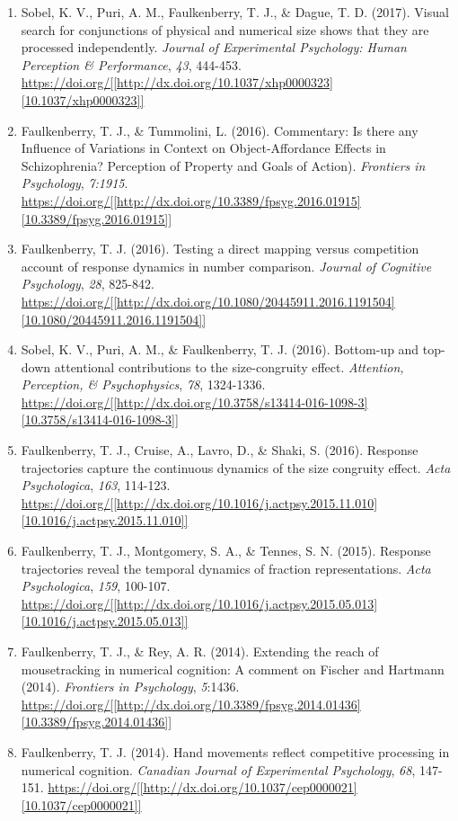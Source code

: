 \documentclass[article,10pt]{article}
\begin{document}
\begin{enumerate}
\item Sobel, K. V., Puri, A. M., Faulkenberry, T. J., \& Dague, T. D. (2017). Visual search for conjunctions of physical and numerical size shows that they are processed independently. \emph{Journal of Experimental Psychology: Human Perception \& Performance}, \emph{43}, 444-453. \url{https://doi.org/[[http://dx.doi.org/10.1037/xhp0000323][10.1037/xhp0000323]]}
\item Faulkenberry, T. J., \& Tummolini, L. (2016). Commentary: Is there any Influence of Variations in Context on Object-Affordance Effects in Schizophrenia? Perception of Property and Goals of Action). \emph{Frontiers in Psychology}, \emph{7:1915}. \url{https://doi.org/[[http://dx.doi.org/10.3389/fpsyg.2016.01915][10.3389/fpsyg.2016.01915]]}
\item Faulkenberry, T. J. (2016). Testing a direct mapping versus competition account of response dynamics in number comparison. \emph{Journal of Cognitive Psychology}, \emph{28}, 825-842. \url{https://doi.org/[[http://dx.doi.org/10.1080/20445911.2016.1191504][10.1080/20445911.2016.1191504]]}
\item Sobel, K. V., Puri, A. M., \& Faulkenberry, T. J. (2016). Bottom-up and top-down attentional contributions to the size-congruity effect. \emph{Attention, Perception, \& Psychophysics}, \emph{78}, 1324-1336. \url{https://doi.org/[[http://dx.doi.org/10.3758/s13414-016-1098-3][10.3758/s13414-016-1098-3]]}
\item Faulkenberry, T. J., Cruise, A., Lavro, D., \& Shaki, S. (2016). Response trajectories capture the continuous dynamics of the size congruity effect. \emph{Acta Psychologica}, \emph{163}, 114-123. \url{https://doi.org/[[http://dx.doi.org/10.1016/j.actpsy.2015.11.010][10.1016/j.actpsy.2015.11.010]]}
\item Faulkenberry, T. J., Montgomery, S. A., \& Tennes, S. N. (2015). Response trajectories reveal the temporal dynamics of fraction representations. \emph{Acta Psychologica}, \emph{159}, 100-107. \url{https://doi.org/[[http://dx.doi.org/10.1016/j.actpsy.2015.05.013][10.1016/j.actpsy.2015.05.013]]}
\item Faulkenberry, T. J., \& Rey, A. R. (2014). Extending the reach of mousetracking in numerical cognition: A comment on Fischer and Hartmann (2014). \emph{Frontiers in Psychology}, \emph{5}:1436. \url{https://doi.org/[[http://dx.doi.org/10.3389/fpsyg.2014.01436][10.3389/fpsyg.2014.01436]]}
\item Faulkenberry, T. J. (2014). Hand movements reflect competitive processing in numerical cognition. \emph{Canadian Journal of Experimental Psychology}, \emph{68}, 147-151. \url{https://doi.org/[[http://dx.doi.org/10.1037/cep0000021][10.1037/cep0000021]]}

\end{enumerate}
\end{document}
